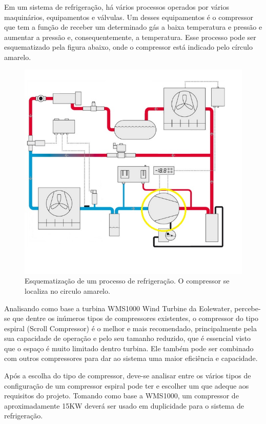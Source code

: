 Em um sistema de refrigeração, há vários processos operados por vários maquinários, equipamentos e válvulas. Um desses equipamentos é o compressor que tem a função de receber um determinado gás a baixa temperatura e pressão e aumentar a pressão e, consequentemente, a temperatura. Esse processo pode ser esquematizado pela figura abaixo, onde o compressor está indicado pelo círculo amarelo.
\begin{figure}[!htbp]
	  \centering
	  \includegraphics[scale=0.7]{editaveis/figuras/compressor}
	  \caption[Esquematização processo refrigeração]{Esquematização de um processo de refrigeração. O compressor se localiza no circulo amarelo.\footnotemark}
	  \label{compressor}
	\end{figure}
	\FloatBarrier
Analisando como base a turbina WMS1000 Wind Turbine da Eolewater, percebe-se que dentre os inúmeros tipos de compressores existentes, o compressor do tipo espiral (Scroll Compressor) é o melhor e mais recomendado, principalmente pela sua capacidade de operação  e pelo seu tamanho reduzido, que é essencial visto que o espaço é muito limitado dentro turbina. Ele também pode ser combinado com outros compressores para dar ao sistema uma maior eficiência e capacidade\cite{compressors}.

Após a escolha do tipo de compressor, deve-se analisar entre os vários tipos de configuração de um compressor espiral pode ter e escolher um que adeque aos requisitos do projeto. Tomando como base a WMS1000, um compressor de aproximadamente 15KW  deverá ser usado em duplicidade para o sistema de refrigeração. 

